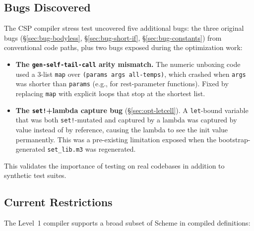 \documentclass[12pt]{report}
\begin{document}
\subsection{Bugs Discovered}

The CSP compiler stress test uncovered five additional bugs:
the three original bugs
(\S\ref{sec:bug-bodyless}, \S\ref{sec:bug-short-if},
\S\ref{sec:bug-constants}) from conventional code paths, plus
two bugs exposed during the optimization work:

\begin{itemize}
\item \textbf{The \texttt{gen-self-tail-call} arity mismatch.}
  The numeric unboxing code used a 3-list \texttt{map} over
  \texttt{(params args all-temps)}, which crashed when \texttt{args}
  was shorter than \texttt{params} (e.g., for rest-parameter
  functions).  Fixed by replacing \texttt{map} with explicit loops
  that stop at the shortest list.

\item \textbf{The \texttt{set!}+lambda capture bug}
  (\S\ref{sec:opt-letcell}).  A \texttt{let}-bound variable that
  was both \texttt{set!}-mutated and captured by a lambda was
  captured by value instead of by reference, causing the lambda
  to see the init value permanently.  This was a pre-existing
  limitation exposed when the bootstrap-generated
  \texttt{set\_lib.m3} was regenerated.
\end{itemize}

\noindent
This validates the importance of testing on real codebases in
addition to synthetic test suites.

\subsection{Current Restrictions}

The Level~1 compiler supports a broad subset of Scheme in
compiled definitions:
\end{document}
